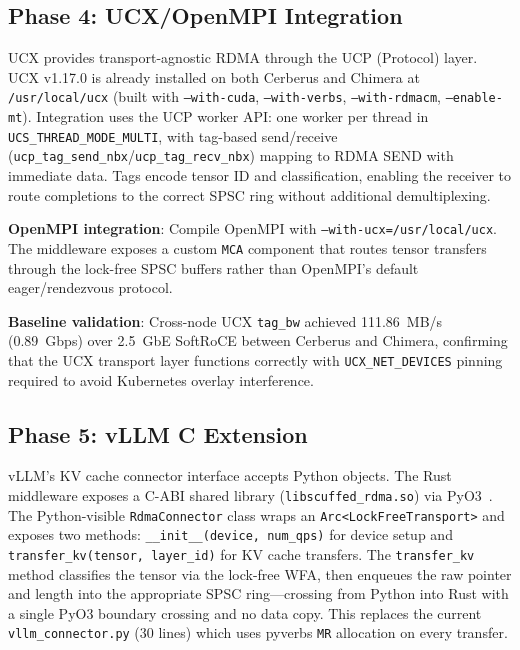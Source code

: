 \documentclass[11pt,letterpaper]{article}
\begin{document}
\subsection{Phase 4: UCX/OpenMPI Integration}

UCX provides transport-agnostic RDMA through the UCP (Protocol) layer. UCX v1.17.0 is already installed on both Cerberus and Chimera at \texttt{/usr/local/ucx} (built with \texttt{--with-cuda}, \texttt{--with-verbs}, \texttt{--with-rdmacm}, \texttt{--enable-mt}). Integration uses the UCP worker API: one worker per thread in \texttt{UCS\_THREAD\_MODE\_MULTI}, with tag-based send/receive (\texttt{ucp\_tag\_send\_nbx}/\texttt{ucp\_tag\_recv\_nbx}) mapping to RDMA SEND with immediate data. Tags encode tensor ID and classification, enabling the receiver to route completions to the correct SPSC ring without additional demultiplexing.

\textbf{OpenMPI integration}: Compile OpenMPI with \texttt{--with-ucx=/usr/local/ucx}. The middleware exposes a custom \texttt{MCA} component that routes tensor transfers through the lock-free SPSC buffers rather than OpenMPI's default eager/rendezvous protocol.

\textbf{Baseline validation}: Cross-node UCX \texttt{tag\_bw} achieved 111.86~MB/s (0.89~Gbps) over 2.5~GbE SoftRoCE between Cerberus and Chimera, confirming that the UCX transport layer functions correctly with \texttt{UCX\_NET\_DEVICES} pinning required to avoid Kubernetes overlay interference.

\subsection{Phase 5: vLLM C Extension}

vLLM's KV cache connector interface accepts Python objects. The Rust middleware exposes a C-ABI shared library (\texttt{libscuffed\_rdma.so}) via PyO3~\cite{pyo3}. The Python-visible \texttt{RdmaConnector} class wraps an \texttt{Arc<LockFreeTransport>} and exposes two methods: \texttt{\_\_init\_\_(device, num\_qps)} for device setup and \texttt{transfer\_kv(tensor, layer\_id)} for KV cache transfers. The \texttt{transfer\_kv} method classifies the tensor via the lock-free WFA, then enqueues the raw pointer and length into the appropriate SPSC ring---crossing from Python into Rust with a single PyO3 boundary crossing and no data copy. This replaces the current \texttt{vllm\_connector.py} (30 lines) which uses pyverbs \texttt{MR} allocation on every transfer.
\end{document}

